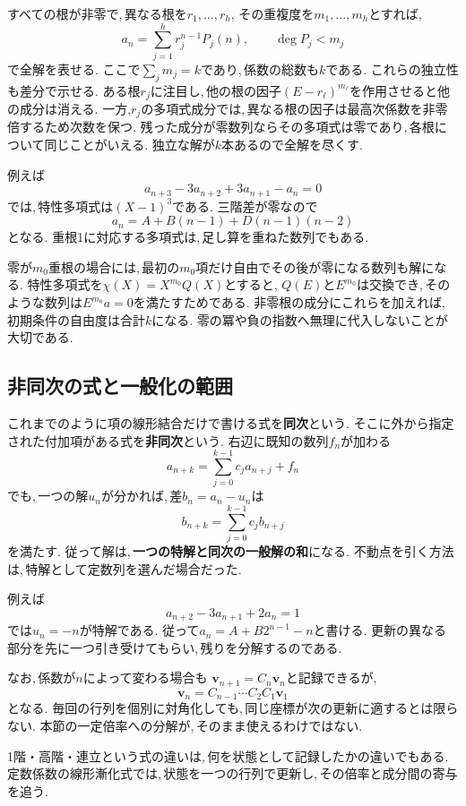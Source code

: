 すべての根が非零で,\,異なる根を$r_1,\ldots,r_h$,
その重複度を$m_1,\ldots,m_h$とすれば,
\[
 a_n=\sum_{j=1}^{h}r_j^{n-1}P_j(n),
 \qquad \deg P_j<m_j
\]
で全解を表せる.
ここで$\sum_jm_j=k$であり,\,係数の総数も$k$である.
これらの独立性も差分で示せる.
ある根$r_j$に注目し,\,他の根の因子$(E-r_\ell)^{m_\ell}$を作用させると他の成分は消える.
一方,$r_j$の多項式成分では,\,異なる根の因子は最高次係数を非零倍するため次数を保つ.
残った成分が零数列ならその多項式は零であり,\,各根について同じことがいえる.
独立な解が$k$本あるので全解を尽くす.

例えば
\[
 a_{n+3}-3a_{n+2}+3a_{n+1}-a_n=0
\]
では,\,特性多項式は$(X-1)^3$である.
三階差が零なので
\[
 a_n=A+B(n-1)+D(n-1)(n-2)
\]
となる. 重根1に対応する多項式は,\,足し算を重ねた数列でもある.

零が$m_0$重根の場合には,\,最初の$m_0$項だけ自由でその後が零になる数列も解になる.
特性多項式を$\chi(X)=X^{m_0}Q(X)$とすると,
$Q(E)$と$E^{m_0}$は交換でき,\,そのような数列は$E^{m_0}a=0$を満たすためである.
非零根の成分にこれらを加えれば,\,初期条件の自由度は合計$k$になる.
零の冪や負の指数へ無理に代入しないことが大切である.

\subsection{非同次の式と一般化の範囲}

これまでのように項の線形結合だけで書ける式を\textbf{同次}という.
そこに外から指定された付加項がある式を\textbf{非同次}という.
右辺に既知の数列$f_n$が加わる
\[
 a_{n+k}=\sum_{j=0}^{k-1}c_j a_{n+j}+f_n
\]
でも,\,一つの解$u_n$が分かれば,\,差$b_n=a_n-u_n$は
\[
 b_{n+k}=\sum_{j=0}^{k-1}c_j b_{n+j}
\]
を満たす.
従って解は,\,\textbf{一つの特解と同次の一般解の和}になる.
不動点を引く方法は,\,特解として定数列を選んだ場合だった.

例えば
\[
 a_{n+2}-3a_{n+1}+2a_n=1
\]
では$u_n=-n$が特解である.
従って$a_n=A+B2^{n-1}-n$と書ける.
更新の異なる部分を先に一つ引き受けてもらい,\,残りを分解するのである.

なお,\,係数が$n$によって変わる場合も
$\boldsymbol v_{n+1}=C_n\boldsymbol v_n$と記録できるが,
\[
 \boldsymbol v_n=C_{n-1}\cdots C_2C_1\boldsymbol v_1
\]
となる. 毎回の行列を個別に対角化しても,\,同じ座標が次の更新に適するとは限らない.
本節の一定倍率への分解が,\,そのまま使えるわけではない.

\begin{bookpoint}
1階・高階・連立という式の違いは,\,何を状態として記録したかの違いでもある.
定数係数の線形漸化式では,\,状態を一つの行列で更新し,\,その倍率と成分間の寄与を追う.
\end{bookpoint}

